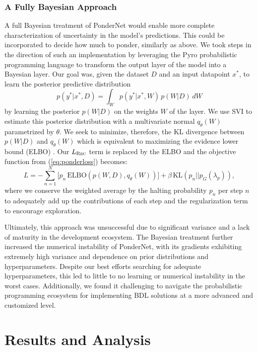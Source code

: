 \documentclass{article}
\begin{document}
\subsubsection{A Fully Bayesian Approach}\label{pyro}

A full Bayesian treatment of PonderNet would enable more complete characterization of uncertainty in the model's predictions. This could be incorporated to decide how much to ponder, similarly as above. We took steps in the direction of such an implementation by leveraging the Pyro probabilistic programming language \citep{bingham_pyro_2019} to transform the output layer of the model into a Bayesian layer. Our goal was, given the dataset $D$ and an input datapoint $x^*$, to learn the posterior predictive distribution
\begin{equation}
    p(y^* | x^*, D) = \int_{W} p(y^* | x^*, W)\, p(W | D)\: dW
\end{equation}
by learning the posterior $p(W | D)$ on the weights $W$ of the layer. We use SVI to estimate this posterior distribution with a multivariate normal $q_{\theta}(W)$ parametrized by $\theta$. We seek to minimize, therefore, the KL divergence between $p(W | D)$ and $q_{\theta}(W)$ which is equivalent to maximizing the evidence lower bound (ELBO) \citep{wingate_automated_2013}. Our $L_{\textsc{Rec}}$ term is replaced by the ELBO and the objective function from (\ref{eq:ponderloss}) becomes:
\begin{equation}
        L = - \sum_{n=1}^N \Big[p_n\,\text{ELBO}(p(W , D), q_{\theta}(W))\Big] + \beta\,\text{KL}(p_n || p_G(\lambda_p)),
\end{equation}
where we conserve the weighted average by the halting probability $p_n$ per step $n$ to adequately add up the contributions of each step and the regularization term to encourage exploration. 

Ultimately, this approach was unsuccessful due to significant variance and a lack of maturity in the development ecosystem. The Bayesian treatment further increased the numerical instability of PonderNet, with its gradients exhibiting extremely high variance and dependence on prior distributions and hyperparameters. Despite our best efforts searching for adequate hyperparameters, this led to little to no learning or numerical instability in the worst cases. Additionally, we found it challenging to navigate the probabilistic programming ecosystem for implementing BDL solutions at a more advanced and customized level.


\section{Results and Analysis} \label{results-and-anal}
\end{document}
